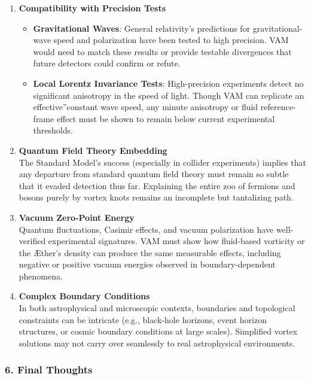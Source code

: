 \begin{enumerate}
    \item \textbf{Compatibility with Precision Tests}
    \begin{itemize}
        \item \textbf{Gravitational Waves}: General relativity's predictions for gravitational-wave speed and polarization have been tested to high precision. VAM would need to match these results or provide testable divergences that future detectors could confirm or refute.
        \item \textbf{Local Lorentz Invariance Tests}: High-precision experiments detect no significant anisotropy in the speed of light. Though VAM can replicate an \grqq effective\textquotedblright constant wave speed, any minute anisotropy or fluid reference-frame effect must be shown to remain below current experimental thresholds.
    \end{itemize}

    \item \textbf{Quantum Field Theory Embedding} \\
    The Standard Model's success (especially in collider experiments) implies that any departure from standard quantum field theory must remain so subtle that it evaded detection thus far. Explaining the entire zoo of fermions and bosons purely by vortex knots remains an incomplete but tantalizing path.

    \item \textbf{Vacuum Zero-Point Energy} \\
    Quantum fluctuations, Casimir effects, and vacuum polarization have well-verified experimental signatures. VAM must show how fluid-based vorticity or the Æther's density can produce the same measurable effects, including negative or positive vacuum energies observed in boundary-dependent phenomena.

    \item \textbf{Complex Boundary Conditions} \\
    In both astrophysical and microscopic contexts, boundaries and topological constraints can be intricate (e.g., black-hole horizons, event horizon structures, or cosmic boundary conditions at large scales). Simplified vortex solutions may not carry over seamlessly to real astrophysical environments.
\end{enumerate}

\subsubsection*{6. Final Thoughts}

